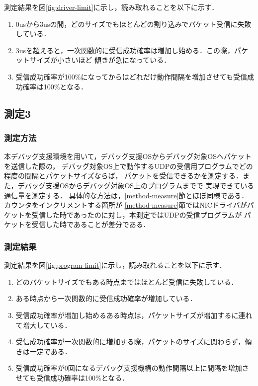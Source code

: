 \documentclass[submit,techreq,noauthor,dvipdfmx]{ipsj}
\begin{document}
測定結果を図\ref{fig:driver-limit}に示し，読み取れることを以下に示す．

\begin{enumerate}
    \item 0usから3usの間，どのサイズでもほとんどの割り込みでパケット受信に失敗している．
    \item 3usを超えると，一次関数的に受信成功確率は増加し始める．この際，パケットサイズが小さいほど
        傾きが急になっている．
    \item 受信成功確率が100\%になってからはどれだけ動作間隔を増加させても受信成功確率は100\%となる．
\end{enumerate}

\subsection{測定3}

\subsubsection{測定方法}

本デバッグ支援環境を用いて，デバッグ支援OSからデバッグ対象OSへパケットを送信した際の，
デバッグ対象OS上で動作するUDPの受信用プログラムでどの程度の間隔とパケットサイズならば，
パケットを受信できるかを測定する．また，デバッグ支援OSからデバッグ対象OS上のプログラムまでで
実現できている通信量を測定する．
具体的な方法は，\ref{method-measure}節とほぼ同様である．カウンタをインクリメントする箇所が
\ref{method-measure}節ではNICドライバがパケットを受信した時であったのに対し，本測定ではUDPの受信プログラムが
パケットを受信した時であることが差分である．

\subsubsection{測定結果}\label{result-program-limit}


測定結果を図\ref{fig:program-limit}に示し，読み取れることを以下に示す．
\begin{enumerate}
    \item どのパケットサイズでもある時点まではほとんど受信に失敗している．
    \item ある時点から一次関数的に受信成功確率が増加している．
    \item 受信成功確率が増加し始めるある時点は，パケットサイズが増加するに連れて増大している．
    \item 受信成功確率が一次関数的に増加する際，パケットのサイズに関わらず，傾きは一定である．
    \item 受信成功確率が0回になるデバッグ支援機構の動作間隔以上に間隔を増加させても受信成功確率は100\%となる．
\end{enumerate}
\end{document}
